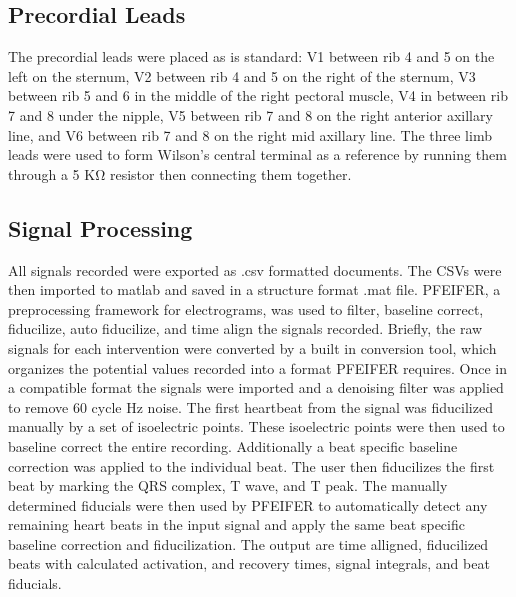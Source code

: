 \documentclass[12pt]{article}
\begin{document}
\subsection{Precordial Leads}
\par{}
The precordial leads were placed as is standard: V1 between rib 4 and 5 on the left on the sternum, V2 between rib 4 and 5 on the right of the sternum, V3 between rib 5 and 6 in the middle of the right pectoral muscle, V4 in between rib 7 and 8 under the nipple, V5 between rib 7 and 8 on the right anterior axillary line, and V6 between rib 7 and 8 on the right mid axillary line. The three limb leads were used to form Wilson's central terminal as a reference by running them through a 5 K\si{\ohm} resistor then connecting them together.

\subsection{Signal Processing}
\par{}
All signals recorded were exported as .csv formatted documents. The CSVs were then imported to matlab and saved in a structure format .mat file. PFEIFER, a preprocessing framework for electrograms, was used to filter, baseline correct, fiducilize, auto fiducilize, and time align the signals recorded.\cite{MacLeod2018_p} Briefly, the raw signals for each intervention were converted by a built in conversion tool, which organizes the potential values recorded into a format PFEIFER requires. Once in a compatible format the signals were imported and  a denoising filter was applied to remove 60 cycle Hz noise.  The first heartbeat from the signal was fiducilized manually by a set of isoelectric points. These isoelectric points were then used to baseline correct the entire recording. Additionally a beat specific baseline correction was applied to the individual beat. The user then fiducilizes the first beat by marking the QRS complex, T wave, and T peak. The manually determined fiducials were then used by PFEIFER to automatically detect any remaining heart beats in the input signal and apply the same beat specific baseline correction and fiducilization. The output are time alligned, fiducilized beats with calculated activation, and recovery times, signal integrals, and beat fiducials.
\end{document}
